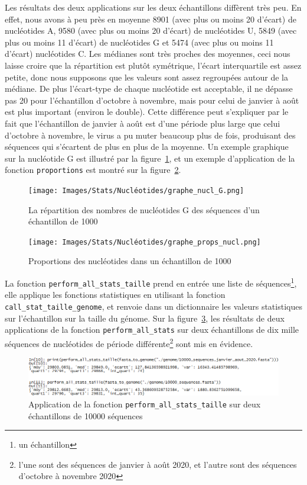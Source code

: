\documentclass[12pt]{article}
\begin{document}
Les résultats des deux applications sur les deux échantillons diffèrent très peu. En effet, nous avons à peu près en moyenne 8901 (avec plus ou moins 20 d'écart) de nucléotides A, 9580 (avec plus ou moins 20 d'écart) de nucléotides U, 5849 (avec plus ou moins 11 d'écart) de nucléotides G et 5474 (avec plus ou moins 11 d'écart) nucléotides C. Les médianes sont très proches des moyennes, ceci nous laisse croire que la répartition est plutôt symétrique, l'écart interquartile est assez petite, donc nous supposons que les valeurs sont assez regroupées autour de la médiane. De plus l'écart-type de chaque nucléotide est acceptable, il ne dépasse pas 20 pour l'échantillon d'octobre à novembre, mais pour celui de janvier à août est plus important (environ le double). Cette différence peut s'expliquer par le fait que l'échantillon de janvier à août est d'une période plus large que celui d'octobre à novembre, le virus a pu muter beaucoup plus de fois, produisant des séquences qui s'écartent de plus en plus de la moyenne. Un exemple graphique sur la nucléotide G est illustré par la figure~\ref{graph:nuclG}, et un exemple d'application de la fonction \texttt{proportions} est montré sur la figure~\ref{graph:propnucl}.

    \begin{figure}[!h]
        \centering
        \texttt{[image: Images/Stats/Nucléotides/graphe\_nucl\_G.png]}
        \caption{La répartition des nombres de nucléotides G des séquences d'un échantillon de 1000}      \label{graph:nuclG}
    \end{figure}
    \begin{figure}[!h]
        \centering
        \texttt{[image: Images/Stats/Nucléotides/graphe\_props\_nucl.png]}
        \caption{Proportions des nucléotides dans un échantillon de 1000}      \label{graph:propnucl}
    \end{figure}

La fonction \texttt{perform\_all\_stats\_taille} prend en entrée une liste de séquences\footnote{un échantillon}, elle applique les fonctions statistiques en utilisant la fonction \texttt{call\_stat\_taille\_genome}, et renvoie dans un dictionnaire les valeurs statistiques sur l'échantillon sur la taille du génome. Sur la figure~\ref{apptaille10000seq}, les résultats de deux applications de la fonction \texttt{perform\_all\_stats} sur deux échantillons de dix mille séquences de nucléotides de période différente\footnote{l'une sont des séquences de janvier à août 2020, et l'autre sont des séquences d'octobre à novembre 2020} sont mis en évidence.
    \begin{figure}[!h]
        \centering
        \includegraphics[scale = 0.8]{Images/Stats/app_10000_seq_taille.PNG}
        \caption{Application de la fonction \texttt{perform\_all\_stats\_taille} sur deux échantillons de 10000 séquences}
        \label{apptaille10000seq}
    \end{figure}
    
\end{document}
